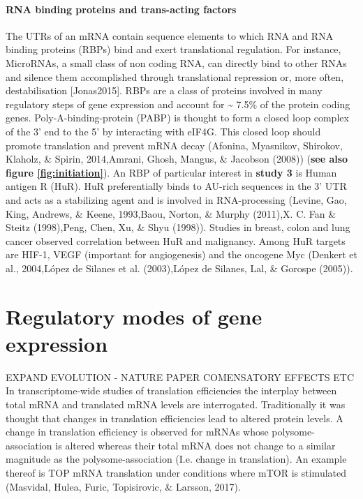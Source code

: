 \documentclass[12pt,openany]{book}
\begin{document}
\paragraph{RNA binding proteins and trans-acting factors}

The UTRs of an mRNA contain sequence elements to which RNA and RNA
binding proteins (RBPs) bind and exert translational regulation. For
instance, MicroRNAs, a small class of non coding RNA, can directly bind
to other RNAs and silence them accomplished through translational
repression or, more often, destabilisation {[}Jonas2015{]}. RBPs are a
class of proteins involved in many regulatory steps of gene expression
and account for \textasciitilde{} 7.5\% of the protein coding genes.
Poly-A-binding-protein (PABP) is thought to form a closed loop complex
of the 3' end to the 5' by interacting with eIF4G. This closed loop
should promote translation and prevent mRNA decay (Afonina, Myasnikov,
Shirokov, Klaholz, \& Spirin, 2014,Amrani, Ghosh, Mangus, \& Jacobson
(2008)) (\textbf{see also figure \ref{fig:initiation}}). An RBP of
particular interest in \textbf{study 3} is Human antigen R (HuR). HuR
preferentially binds to AU-rich sequences in the 3' UTR and acts as a
stabilizing agent and is involved in RNA-processing (Levine, Gao, King,
Andrews, \& Keene, 1993,Baou, Norton, \& Murphy (2011),X. C. Fan \&
Steitz (1998),Peng, Chen, Xu, \& Shyu (1998)). Studies in breast, colon
and lung cancer observed correlation between HuR and malignancy. Among
HuR targets are HIF-1, VEGF (important for angiogenesis) and the
oncogene Myc (Denkert et al., 2004,López de Silanes et al. (2003),López
de Silanes, Lal, \& Gorospe (2005)).

\section{Regulatory modes of gene expression}

EXPAND EVOLUTION - NATURE PAPER COMENSATORY EFFECTS ETC In
transcriptome-wide studies of translation efficiencies the interplay
between total mRNA and translated mRNA levels are interrogated.
Traditionally it was thought that changes in translation efficiencies
lead to altered protein levels. A change in translation efficiency is
observed for mRNAs whose polysome-association is altered whereas their
total mRNA does not change to a similar magnitude as the
polysome-association (I.e. change in translation). An example thereof is
TOP mRNA translation under conditions where mTOR is stimulated
(Masvidal, Hulea, Furic, Topisirovic, \& Larsson, 2017).
\end{document}

